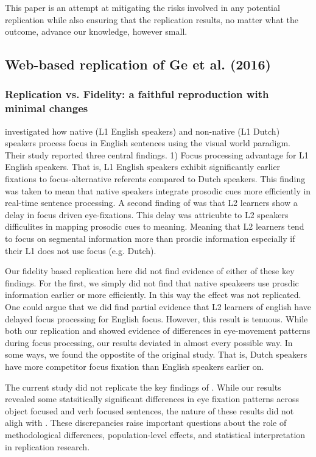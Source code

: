 This paper is an attempt at mitigating the risks involved in any potential replication while also ensuring that the replication results, no matter what the outcome, advance our knowledge, however small. 

\subsection{Web-based replication of Ge et al. (2016)}

\subsubsection{Replication vs. Fidelity: a faithful reproduction with minimal changes}

\cite{Ge2021} investigated how native (L1 English speakers) and non-native (L1 Dutch) speakers process focus in English sentences using the visual world paradigm. Their study reported three central findings. 1) Focus processing advantage for L1 English speakers. That is, L1 English speakers exhibit significantly earlier fixations to focus-alternative referents compared to Dutch speakers. This finding was taken to mean that native speakers integrate prosodic cues more efficiently in real-time sentence processing. A second finding of \citep{Ge2021} was that L2 learners show a delay in focus driven eye-fixations. This delay was attricubte to L2 speakers difficulites in mapping prosodic cues to meaning. Meaning that L2 learners tend to focus on segmental information more than prosdic information especially if their L1 does not use focus (e.g. Dutch). 

Our fidelity based replication here did not find evidence  of either of these key findings. For the first, we simply did not find that native speakeers use prosdic information earlier or more efficiently. In this way the effect was not replicated. One could argue that we did find partial evidence that L2 learners of english have delayed focus processing for English focus. However, this result is tenuous. While both our replication and \cite{Ge2021} showed evidence of differences in eye-movement patterns during focus processing, our results deviated in almost every possible way. In some ways, we found the oppostite of the original study. That is, Dutch speakers have more competitor focus fixation than English speakers earlier on.  

The current study did not replicate the key findings of \citep{Ge2021}. While our results revealed some statsitically significant differences in eye fixation patterns across object focused and verb focused sentences, the nature of these results did not aligh with \citep{Ge2021}. These discrepancies raise important questions about the role of methodological differences, population-level effects, and statistical interpretation in replication research. 

